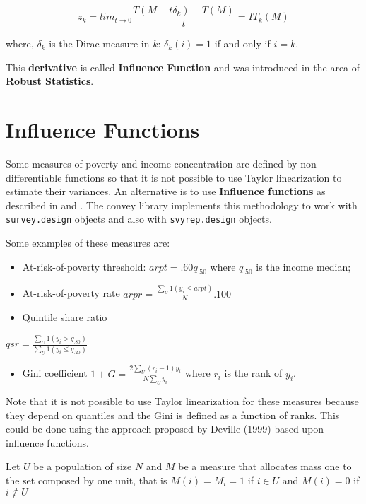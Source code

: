 \documentclass[]{book}
\providecommand{\tightlist}{%
  \setlength{\itemsep}{0pt}\setlength{\parskip}{0pt}}
\begin{document}
\begin{equation}
z_k=lim_{t\rightarrow0}\frac{T(M+t\delta_k)-T(M)}{t}=IT_k(M)
\label{eq:lin}
\end{equation}

where, \(\delta_k\) is the Dirac measure in \(k\): \(\delta_k(i)=1\) if and only if \(i=k\).

This \textbf{derivative} is called \textbf{Influence Function} and was introduced in the area of \textbf{Robust Statistics}.

\hypertarget{influence-functions}{%
\section{Influence Functions}\label{influence-functions}}

Some measures of poverty and income concentration are defined by non-differentiable functions so that it is not possible to use Taylor linearization to estimate their variances. An alternative is to use \textbf{Influence functions} as described in \citet{deville1999} and \citet{osier2009}. The convey library implements this methodology to work with \texttt{survey.design} objects and also with \texttt{svyrep.design} objects.

Some examples of these measures are:

\begin{itemize}
\item
  At-risk-of-poverty threshold:
  \(arpt=.60q_{.50}\) where \(q_{.50}\) is the income median;
\item
  At-risk-of-poverty rate
  \(arpr=\frac{\sum_U 1(y_i \leq arpt)}{N}.100\)
\item
  Quintile share ratio
\end{itemize}

\(qsr=\frac{\sum_U 1(y_i>q_{.80})}{\sum_U 1(y_i\leq q_{.20})}\)

\begin{itemize}
\tightlist
\item
  Gini coefficient
  \(1+G=\frac{2\sum_U (r_i-1)y_i}{N\sum_Uy_i}\)
  where \(r_i\) is the rank of \(y_i\).
\end{itemize}

Note that it is not possible to use Taylor linearization for these measures because they depend on quantiles and the Gini is defined as a function of ranks. This could be done using the approach proposed by Deville (1999) based upon influence functions.

Let \(U\) be a population of size \(N\) and \(M\) be a measure that allocates mass one to the set composed by one unit, that is \(M(i)=M_i= 1\) if \(i\in U\) and \(M(i)=0\) if \(i\notin U\)
\end{document}
